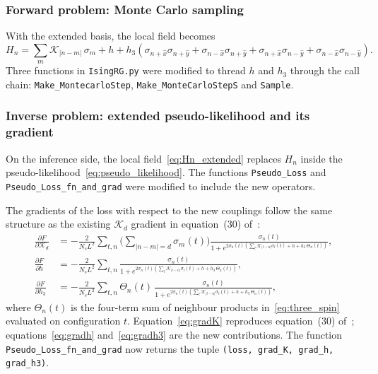 \documentclass[a4paper, 11pt]{article}
\begin{document}
\subsubsection*{Forward problem: Monte Carlo sampling}

With the extended basis, the local field becomes
\begin{equation}
  H_n = \sum_m \mathcal{K}_{|n-m|}\,\sigma_m + h
  + h_3\!\left(
    \sigma_{n+\hat{x}}\sigma_{n+\hat{y}}
   +\sigma_{n-\hat{x}}\sigma_{n+\hat{y}}
   +\sigma_{n+\hat{x}}\sigma_{n-\hat{y}}
   +\sigma_{n-\hat{x}}\sigma_{n-\hat{y}}
  \right).
  \label{eq:Hn_extended}
\end{equation}
Three functions in \texttt{IsingRG.py} were modified to thread $h$ and $h_3$ through the call chain: \texttt{Make\_MontecarloStep}, \texttt{Make\_MonteCarloStepS} and \texttt{Sample}.


\subsubsection*{Inverse problem: extended pseudo-likelihood and its gradient}

On the inference side, the local field~\eqref{eq:Hn_extended} replaces $H_n$ inside the pseudo-likelihood~\eqref{eq:pseudo_likelihood}. The functions \texttt{Pseudo\_Loss} and \texttt{Pseudo\_Loss\_fn\_and\_grad} were modified to include the new operators.

The gradients of the loss with respect to the new couplings follow the same structure as the existing $\mathcal{K}_d$ gradient in equation~(30) of~\cite{blocking}:
\begin{align}
  \frac{\partial F}{\partial \mathcal{K}_d}
    &= -\frac{2}{N_s L^2}\sum_{t,n}
       \biggl(\sum_{|n-m|=d}\sigma_m(t)\biggr)
       \frac{\sigma_n(t)}{1+e^{2\sigma_n(t)
       \left(\sum_l \mathcal{K}_{|l-n|}\sigma_l(t)
       + h + h_3\,\Theta_n(t)\right)}} ,
    \label{eq:gradK}\\[4pt]
  \frac{\partial F}{\partial h}
    &= -\frac{2}{N_s L^2}\sum_{t,n}
       \frac{\sigma_n(t)}{1+e^{2\sigma_n(t)
       \left(\sum_l \mathcal{K}_{|l-n|}\sigma_l(t)
       + h + h_3\,\Theta_n(t)\right)}} ,
    \label{eq:gradh}\\[4pt]
  \frac{\partial F}{\partial h_3}
    &= -\frac{2}{N_s L^2}\sum_{t,n}
       \Theta_n(t)\,
       \frac{\sigma_n(t)}{1+e^{2\sigma_n(t)
       \left(\sum_l \mathcal{K}_{|l-n|}\sigma_l(t)
       + h + h_3\,\Theta_n(t)\right)}} ,
    \label{eq:gradh3}
\end{align}
where $\Theta_n(t)$ is the four-term sum of neighbour products in~\eqref{eq:three_spin} evaluated on configuration $t$. Equation~\eqref{eq:gradK} reproduces equation~(30) of~\cite{blocking}; equations~\eqref{eq:gradh} and~\eqref{eq:gradh3} are the new contributions. The function \texttt{Pseudo\_Loss\_fn\_and\_grad} now returns the tuple \texttt{(loss, grad\_K, grad\_h, grad\_h3)}.
\end{document}
